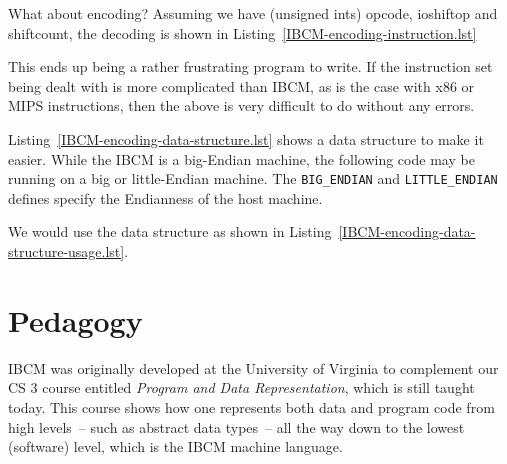 What about encoding?  Assuming we have (unsigned ints) opcode,
ioshiftop and shiftcount, the decoding is shown in Listing~\ref{IBCM-encoding-instruction.lst}



This ends up being a rather frustrating program to write.  If the
instruction set being dealt with is more complicated than IBCM, as is
the case with x86 or MIPS instructions, then the above is very
difficult to do without any errors.

Listing~\ref{IBCM-encoding-data-structure.lst} shows a data structure
to make it easier.  While the IBCM is a big-Endian machine, the
following code may be running on a big or little-Endian machine.  The
{\tt BIG\_ENDIAN} and {\tt LITTLE\_ENDIAN} defines specify the
Endianness of the host machine.

\begin{figure}[h!]

\end{figure}

We would use the data structure as shown in Listing~\ref{IBCM-encoding-data-structure-usage.lst}.

\begin{figure}[h!]

\end{figure}

\section{Pedagogy}

IBCM was originally developed at the University of Virginia to
complement our CS 3 course entitled {\em Program and Data
  Representation}, which is still taught today.  This course shows how
one represents both data and program code from high levels~-- such as
abstract data types~-- all the way down to the lowest (software)
level, which is the IBCM machine language.

